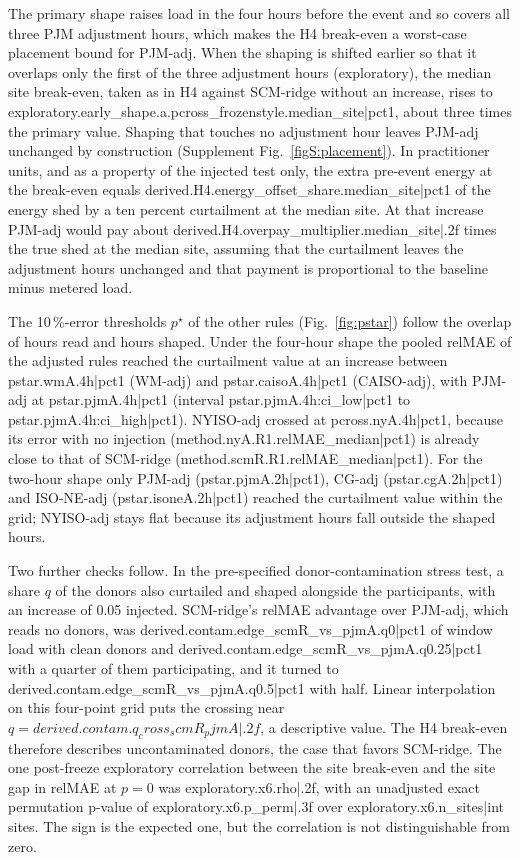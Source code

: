 The primary shape raises load in the four hours before the event and so covers all three PJM adjustment hours, which makes the H4 break-even a worst-case placement bound for PJM-adj. When the shaping is shifted earlier so that it overlaps only the first of the three adjustment hours (exploratory), the median site break-even, taken as in H4 against SCM-ridge without an increase, rises to {{exploratory.early_shape.a.pcross_frozenstyle.median_site|pct1}}, about three times the primary value. Shaping that touches no adjustment hour leaves PJM-adj unchanged by construction (Supplement Fig.~\ref{figS:placement}). In practitioner units, and as a property of the injected test only, the extra pre-event energy at the break-even equals {{derived.H4.energy_offset_share.median_site|pct1}} of the energy shed by a ten percent curtailment at the median site. At that increase PJM-adj would pay about {{derived.H4.overpay_multiplier.median_site|.2f}} times the true shed at the median site, assuming that the curtailment leaves the adjustment hours unchanged and that payment is proportional to the baseline minus metered load.

The 10\,\%-error thresholds $p^{\star}$ of the other rules (Fig.~\ref{fig:pstar}) follow the overlap of hours read and hours shaped. Under the four-hour shape the pooled relMAE of the adjusted rules reached the curtailment value at an increase between {{pstar.wmA.4h|pct1}} (WM-adj) and {{pstar.caisoA.4h|pct1}} (CAISO-adj), with PJM-adj at {{pstar.pjmA.4h|pct1}} (interval {{pstar.pjmA.4h:ci_low|pct1}} to {{pstar.pjmA.4h:ci_high|pct1}}). NYISO-adj crossed at {{pcross.nyA.4h|pct1}}, because its error with no injection ({{method.nyA.R1.relMAE_median|pct1}}) is already close to that of SCM-ridge ({{method.scmR.R1.relMAE_median|pct1}}). For the two-hour shape only PJM-adj ({{pstar.pjmA.2h|pct1}}), CG-adj ({{pstar.cgA.2h|pct1}}) and ISO-NE-adj ({{pstar.isoneA.2h|pct1}}) reached the curtailment value within the grid; NYISO-adj stays flat because its adjustment hours fall outside the shaped hours.

Two further checks follow. In the pre-specified donor-contamination stress test, a share $q$ of the donors also curtailed and shaped alongside the participants, with an increase of 0.05 injected. SCM-ridge's relMAE advantage over PJM-adj, which reads no donors, was {{derived.contam.edge_scmR_vs_pjmA.q0|pct1}} of window load with clean donors and {{derived.contam.edge_scmR_vs_pjmA.q0.25|pct1}} with a quarter of them participating, and it turned to {{derived.contam.edge_scmR_vs_pjmA.q0.5|pct1}} with half. Linear interpolation on this four-point grid puts the crossing near $q={{derived.contam.q_cross_scmR_pjmA|.2f}}$, a descriptive value. The H4 break-even therefore describes uncontaminated donors, the case that favors SCM-ridge. The one post-freeze exploratory correlation between the site break-even and the site gap in relMAE at $p=0$ was {{exploratory.x6.rho|.2f}}, with an unadjusted exact permutation p-value of {{exploratory.x6.p_perm|.3f}} over {{exploratory.x6.n_sites|int}} sites. The sign is the expected one, but the correlation is not distinguishable from zero.

